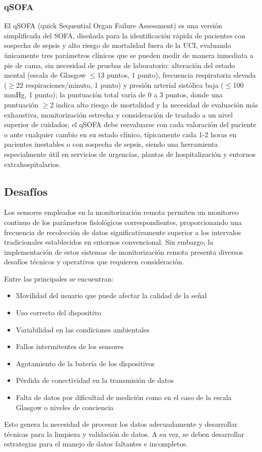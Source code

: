 \subsubsection{qSOFA}
El qSOFA (quick Sequential Organ Failure Assessment) es una versión simplificada del SOFA, diseñada para la identificación rápida de pacientes con sospecha de sepsis y alto riesgo de mortalidad fuera de la UCI, 
evaluando únicamente tres parámetros clínicos que se pueden medir de manera inmediata a pie de cama, sin necesidad de pruebas de laboratorio: 
alteración del estado mental (escala de Glasgow $\leq$13 puntos, 1 punto), frecuencia respiratoria elevada ($\geq$22 respiraciones/minuto, 1 punto) y presión arterial sistólica baja ($\leq$100 mmHg, 1 punto);
la puntuación total varía de 0 a 3 puntos, donde una puntuación $\geq$2 indica alto riesgo de mortalidad y la necesidad de evaluación más exhaustiva, monitorización estrecha
y consideración de traslado a un nivel superior de cuidados; el qSOFA debe reevaluarse con cada valoración del paciente o ante cualquier cambio en su estado clínico, 
típicamente cada 1-2 horas en pacientes inestables o con sospecha de sepsis, siendo una herramienta especialmente útil en servicios de urgencias, plantas de hospitalización y entornos extrahospitalarios.

\newpage

\subsection{Desafíos}

Los sensores empleados en la monitorización remota permiten un monitoreo continuo de los parámetros fisiológicos correspondientes, 
proporcionando una frecuencia de recolección de datos significativamente superior a los intervalos tradicionales establecidos en entornos convencional. 
Sin embargo, la implementación de estos sistemas de monitorización remota presenta diversos desafíos técnicos y operativos que requieren consideración. 

Entre las principales se encuentran:

\begin{itemize}
    \item Movilidad del usuario que puede afectar la calidad de la señal
    \item Uso correcto del dispositivo
    \item Variabilidad en las condiciones ambientales
    \item Fallos intermitentes de los sensores
    \item Agotamiento de la batería de los dispositivos
    \item Pérdida de conectividad en la transmisión de datos
    \item Falta de datos por dificultad de medición como en el caso de la escala Glasgow o niveles de conciencia
\end{itemize}

Esto genera la necesidad de procesar los datos adecuadamente y desarrollar técnicas para la limpieza y validación de datos.
A su vez, se deben desarrollar estrategias para el manejo de datos faltantes e incompletos. \parencite{rpm_pm}
